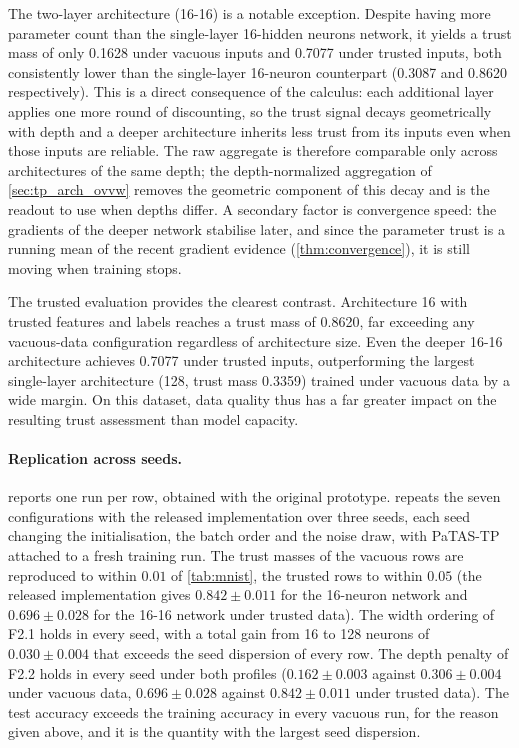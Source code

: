 The two-layer architecture (16-16) is a notable exception. Despite having more parameter count than the single-layer 16-hidden neurons network, it yields a trust mass of only 0.1628 under vacuous inputs and 0.7077 under trusted inputs, both consistently lower than the single-layer 16-neuron counterpart (0.3087 and 0.8620 respectively). This is a direct consequence of the calculus: each additional layer applies one more round of discounting, so the trust signal decays geometrically with depth and a deeper architecture inherits less trust from its inputs even when those inputs are reliable. The raw aggregate is therefore comparable only across architectures of the same depth; the depth-normalized aggregation of \cref{sec:tp_arch_ovvw} removes the geometric component of this decay and is the readout to use when depths differ. A secondary factor is convergence speed: the gradients of the deeper network stabilise later, and since the parameter trust is a running mean of the recent gradient evidence (\cref{thm:convergence}), it is still moving when training stops.

The trusted evaluation provides the clearest contrast. Architecture 16 with trusted features and labels reaches a trust mass of 0.8620, far exceeding any vacuous-data configuration regardless of architecture size. Even the deeper 16-16 architecture achieves 0.7077 under trusted inputs, outperforming the largest single-layer architecture (128, trust mass 0.3359) trained under vacuous data by a wide margin. On this dataset, data quality thus has a far greater impact on the resulting trust assessment than model capacity.

\paragraph*{Replication across seeds.}  reports one run per row, obtained with the original prototype.  repeats the seven configurations with the released implementation over three seeds, each seed changing the initialisation, the batch order and the noise draw, with \ac{PaTAS-TP} attached to a fresh training run. The trust masses of the vacuous rows are reproduced to within $0.01$ of \cref{tab:mnist}, the trusted rows to within $0.05$ (the released implementation gives $0.842 \pm 0.011$ for the 16-neuron network and $0.696 \pm 0.028$ for the 16-16 network under trusted data). The width ordering of F2.1 holds in every seed, with a total gain from 16 to 128 neurons of $0.030 \pm 0.004$ that exceeds the seed dispersion of every row. The depth penalty of F2.2 holds in every seed under both profiles ($0.162 \pm 0.003$ against $0.306 \pm 0.004$ under vacuous data, $0.696 \pm 0.028$ against $0.842 \pm 0.011$ under trusted data). The test accuracy exceeds the training accuracy in every vacuous run, for the reason given above, and it is the quantity with the largest seed dispersion.


